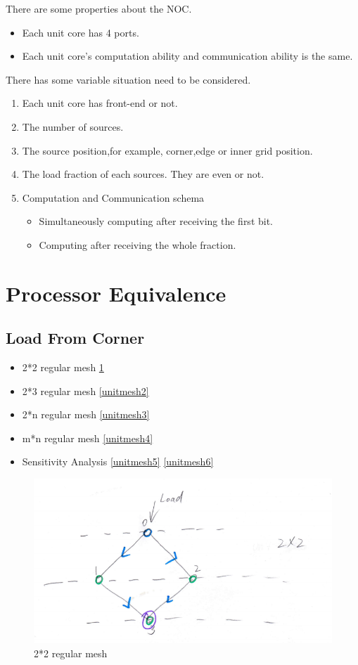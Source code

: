 \documentclass[preprint,12pt]{elsarticle}
\begin{document}
There are some properties about the NOC.

\begin{itemize}
\item Each unit core has 4 ports.
\item Each unit core's computation ability and communication ability is the same.
\end{itemize}
There has some variable situation need to be considered.
\begin{enumerate}
\item Each unit core has front-end or not.
\item The number of sources.
\item The source position,for example, corner,edge or inner grid position.
\item The load fraction of each sources. They are even or not.
\item Computation and Communication schema
	\begin{itemize}
	\item Simultaneously computing after receiving the first bit.
    \item Computing after receiving the whole fraction.
	\end{itemize}
\end{enumerate}






\section{Processor Equivalence}

\subsection{Load From Corner}
\begin{itemize}
\item 2*2 regular mesh \ref{unitmesh}
\item 2*3 regular mesh \ref{unitmesh2}
\item 2*n regular mesh \ref{unitmesh3}
\item m*n regular mesh \ref{unitmesh4}
\item Sensitivity Analysis \ref{unitmesh5} \ref{unitmesh6}
\end{itemize}


\begin{figure}[h]
\centering\includegraphics[width=1\linewidth]{unitmesh}
\caption{2*2 regular mesh}
\label{unitmesh}
\end{figure}
\end{document}

